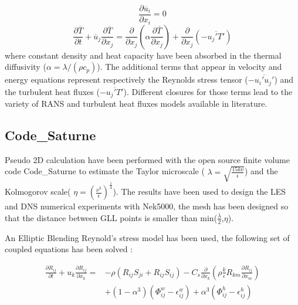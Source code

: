 \documentclass[11pt,letterpaper,english]{article}
\begin{document}
\begin{equation}
\frac{\partial \overline{u}_i}{\partial x_i} = 0
\label{rhoEqnRANS}
\end{equation}
\begin{equation}
 \frac{\partial \overline{T} }{\partial t} + \overline{u}_j \frac{\partial \overline{T}}{\partial x_j}  = \frac{\partial }{\partial x_j} \left( \alpha \frac{\partial \overline{T}}{\partial x_j} \right) +\frac{\partial}{\partial x_j} \left( -\overline{u_j' T'}\right)
\label{EEqnRANS}
\end{equation}
where constant density and heat capacity have been absorbed in the thermal diffusivity ($\alpha = \lambda / (\rho c_p)$). The additional terms that appear in velocity and energy equations represent respectively the Reynolds stress tensor ($-\overline{u_i' u_j'} $) and the turbulent heat fluxes ($ -\overline{u_j' T'}$). Different closures for those terms lead to the variety of RANS and turbulent heat fluxes models available in literature.

\subsection{Code\_Saturne}

Pseudo 2D calculation have been performed with the open source finite volume code Code\_Saturne to estimate the Taylor microscale ( $ \lambda = \sqrt{\frac{15 k \nu}{\epsilon}} $) and the Kolmogorov scale( $ \eta = (\frac{\nu^{3}}{\epsilon})^{\frac{1}{4}}$). The results have been used to design the LES and DNS numerical experiments with Nek5000, the mesh has been designed so that the distance between GLL points is smaller than min($\frac{\lambda}{2}$,$\eta$).

An Elliptic Blending Reynold's stress model\cite{manceau2002} has been used, the following set of coupled equations has been solved : 


\begin{equation}
\begin{split}
  \frac{\partial R_{ij}}{\partial t} + u_{k}\frac{\partial R_{ij}}{\partial x_{k}} = & -\rho ( R_{ij}S_{ji} + R_{ij}S_{ij} ) - C_{s} \frac{\partial}{\partial x_{k}}( \rho\frac{k}{\epsilon} R_{km}\frac{\partial R_{ij}}{\partial x_{m}}) \\ 
  & + (1-\alpha^{3})(\Phi_{ij}^{w} -\epsilon_{ij}^{w}) + \alpha^{3}(\Phi_{ij}^{h} - \epsilon_{ij}^{h})
\end{split}
\end{equation}
\end{document}
